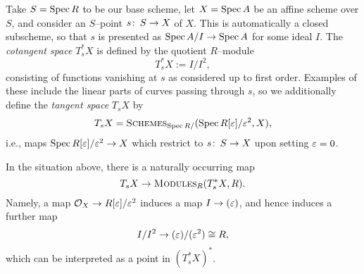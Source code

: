 \begin{definition}\label{DefnOfCoTangentSpaces}
Take \(S = \operatorname{Spec} R\) to be our base scheme, let \(X = \operatorname{Spec} A\) be an affine scheme over \(S\), and consider an \(S\)--point \(s\colon\thinspace S \to X\) of \(X\).  This is automatically a closed subscheme, so that \(s\) is presented as \(\operatorname{Spec} A/I \to \operatorname{Spec} A\) for some ideal \(I\).  The \textit{cotangent space} \(T^*_s X\) is defined by the quotient \(R\)--module \[T^*_s X := I / I^2,\] consisting of functions vanishing at \(s\) as considered up to first order.  Examples of these include the linear parts of curves passing through \(s\), so we additionally define the \textit{tangent space} \(T_s X\) by \[T_s X = \normalfont\textsc{Schemes}_{\operatorname{Spec} R/}(\operatorname{Spec} R[\varepsilon] / \varepsilon^2, X),\] i.e., maps \(\operatorname{Spec} R[\varepsilon] / \varepsilon^2 \to X\) which restrict to \(s\colon\thinspace S \to X\) upon setting \(\varepsilon = 0\).
\end{definition}

\begin{remark}
In the situation above, there is a naturally occurring map \[T_s X \to \normalfont\textsc{Modules}_R(T^*_s X, R).\]  Namely, a map \(\mathcal{O}_X \to R[\varepsilon] / \varepsilon^2\) induces a map \(I \to (\varepsilon)\), and hence induces a further map \[I / I^2 \to (\varepsilon) / (\varepsilon^2) \cong R,\] which can be interpreted as a point in \((T^*_s X)^*\).
\end{remark}

